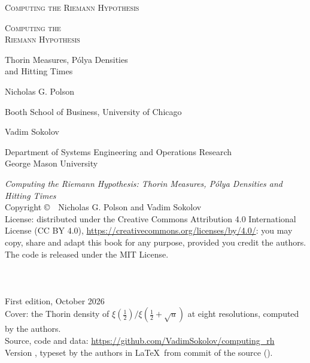 \documentclass[11pt,twoside,openright]{book}
\makeatletter
\theoremstyle{sc}
\theoremstyle{scr}
\numberwithin{equation}{section}
\renewcommand{\cleardoublepage}{\clearpage\ifodd\c@page\else\hbox{}\thispagestyle{empty}\newpage\fi}
\makeatother
\begin{document}
\frontmatter
\ifdefined\kdpbuild
\thispagestyle{empty}
\vspace*{2.2in}
\begin{center}{\LARGE\scshape Computing the Riemann Hypothesis\par}\end{center}
\cleardoublepage
\thispagestyle{empty}
\begin{center}
\vspace*{1.1in}
{\Huge\scshape Computing the\\[0.35em] Riemann Hypothesis\par}
\vspace{0.8cm}
{\Large Thorin Measures, P\'olya Densities\\[0.2em] and Hitting Times\par}
\vspace{2.2cm}
{\large Nicholas G. Polson\par}
{\small Booth School of Business, University of Chicago\par}
\vspace{0.6cm}
{\large Vadim Sokolov\par}
{\small Department of Systems Engineering and Operations Research\\ George Mason University\par}
\end{center}
\clearpage
\thispagestyle{empty}
\vspace*{\fill}
\begin{flushleft}\small
\textit{Computing the Riemann Hypothesis: Thorin Measures, P\'olya Densities and Hitting Times}\\[1em]
Copyright \copyright\ \BookYear\ Nicholas G. Polson and Vadim Sokolov\\[1em]
License: distributed under the Creative Commons Attribution 4.0 International License (CC BY 4.0), \url{https://creativecommons.org/licenses/by/4.0/}: you may copy, share and adapt this book for any purpose, provided you credit the authors. The code is released under the MIT License.\\[1em]
\ifx\BookISBNline\empty\else\BookISBNline\\[1em]\fi
\ifx\BookDOIline\empty\else\BookDOIline\\[1em]\fi
\kdpimprint\\[1em]
First edition, October 2026\\[1em]
Cover: the Thorin density of $\xi(\frac12)/\xi(\frac12+\sqrt u)$ at eight resolutions, computed by the authors.\\[1em]
Source, code and data: \url{https://github.com/VadimSokolov/computing_rh}\\[1em]
Version \BookVersion, typeset by the authors in \LaTeX\ from commit \texttt{\bookcommit} of the source (\bookcommitdate).
\end{flushleft}
\end{document}
